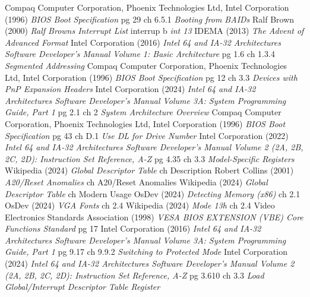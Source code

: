 \documentclass{article}
\begin{document}
\begin{thebibliography}{99}
		Compaq Computer Corporation, Phoenix Technologies Ltd, Intel Corporation (1996)
		\emph{BIOS Boot Specification}
		pg 29 ch 6.5.1 \emph{Booting from BAIDs}
		Ralf Brown (2000)
		\emph{Ralf Browns Interrupt List}
		interrup b \emph{int 13}
		IDEMA (2013)
		\emph{The Advent of Advanced Format}
		Intel Corporation (2016)
		\emph{Intel 64 and IA-32 Architectures Software Developer’s Manual Volume 1: Basic Architecture}
		pg 1.6 ch 1.3.4 \emph{Segmented Addressing}
		Compaq Computer Corporation, Phoenix Technologies Ltd, Intel Corporation (1996)
		\emph{BIOS Boot Specification}
		pg 12 ch 3.3 \emph{Devices with PnP Expansion Headers}
		Intel Corporation (2024)
		\emph{Intel 64 and IA-32 Architectures Software Developer’s Manual Volume 3A: System Programming Guide, Part 1}
		pg 2.1 ch 2 \emph{System Architecture Overview}
		Compaq Computer Corporation, Phoenix Technologies Ltd, Intel Corporation (1996)
		\emph{BIOS Boot Specification}
		pg 43 ch D.1 \emph{Use DL for Drive Number}
		Intel Corporation (2022)
		\emph{Intel 64 and IA-32 Architectures Software Developer’s Manual Volume 2 (2A, 2B, 2C, 2D): Instruction Set Reference, A-Z}
		pg 4.35 ch 3.3 \emph{Model-Specific Registers}
		Wikipedia (2024)
		\emph{Global Descriptor Table}
		ch Description
		Robert Collins (2001)
		\emph{A20/Reset Anomalies}
		ch A20/Reset Anomalies
		Wikipedia (2024)
		\emph{Global Descriptor Table}
		ch Modern Usage
		OsDev (2024)
		\emph{Detecting Memory (x86)}
		ch 2.1
		OsDev (2024)
		\emph{VGA Fonts}
		ch 2.4
		Wikipedia (2024)
		\emph{Mode 13h}
		ch 2.4
		Video Electronics Standards Association (1998)
		\emph{VESA BIOS EXTENSION (VBE) Core Functions Standard}
		pg 17
		Intel Corporation (2016)
		\emph{Intel 64 and IA-32 Architectures Software Developer’s Manual Volume 3A: System Programming Guide, Part 1}
		pg 9.17 ch 9.9.2 \emph{Switching to Protected Mode}
		Intel Corporation (2024)
		\emph{Intel 64 and IA-32 Architectures Software Developer’s Manual Volume 2 (2A, 2B, 2C, 2D): Instruction Set Reference, A-Z}
		pg 3.610 ch 3.3 \emph{Load Global/Interrupt Descriptor Table Register}
\end{thebibliography}
\end{document}
